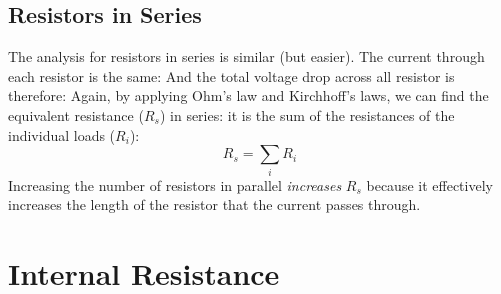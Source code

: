 \subsection{Resistors in Series}
\begin{figure}[ht]
  \centering
\end{figure}
The analysis for resistors in series is similar (but easier). The current
through each resistor is the same:
And the total voltage drop across all resistor is therefore:
%
%
%
%
Again, by applying Ohm's law and Kirchhoff's laws, we can find the equivalent
resistance ($R_s$) in series: it is the sum of the resistances of the
individual loads ($R_i$):
\begin{equation}
  \boxed{R_s=\sum_iR_i}
\end{equation}
Increasing the number of resistors in parallel \emph{increases} $R_s$ because
it effectively increases the length of the resistor that the current passes
through.
%
%
%
%
%
%
%
%
\section{Internal Resistance}

